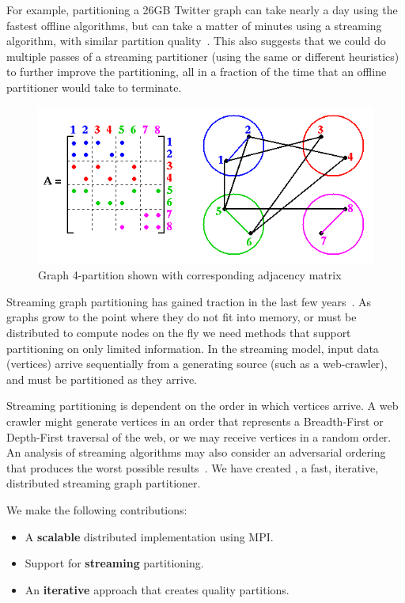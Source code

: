 For example, partitioning a 26GB Twitter graph can take nearly a day using the fastest offline algorithms, but can take a matter of minutes using a streaming algorithm, with similar partition quality~\cite{tsourakakis2012fennel}.
This also suggests that we could do multiple passes of a streaming partitioner (using the same or different heuristics) to further improve the partitioning, all in a fraction of the time that an offline partitioner would take to terminate.


\begin{figure}[h]
\centering
\includegraphics[width=0.8\columnwidth] {figures/graphpart.png}
\caption[Caption for]{Graph 4-partition shown with corresponding adjacency matrix}
\label{fig:0}
\end{figure}


Streaming graph partitioning has gained traction in the last few years~\cite{DBLP:journals/corr/abs-1212-1121,Stanton:2012:SGP:2339530.2339722,tsourakakis2012fennel}.
As graphs grow to the point where they do not fit into memory, or must be distributed to compute nodes on the fly we need methods that support partitioning on only limited information.
In the streaming model, input data (vertices) arrive sequentially from a generating source (such as a web-crawler), and must be partitioned as they arrive.

Streaming partitioning is dependent on the order in which vertices arrive.
A web crawler might generate vertices in an order that represents a Breadth-First or Depth-First traversal of the web, or we may receive vertices in a random order.
An analysis of streaming algorithms may also consider an adversarial ordering that produces the worst possible results~\cite{Stanton:2012:SGP:2339530.2339722}.
We have created \ourmethod, a fast, iterative, distributed streaming graph partitioner.

We make the following contributions:
\begin{itemize}
\item A \textbf{scalable} distributed implementation using MPI.
\item Support for \textbf{streaming} partitioning.
\item An \textbf{iterative} approach that creates quality partitions.
\end{itemize}



